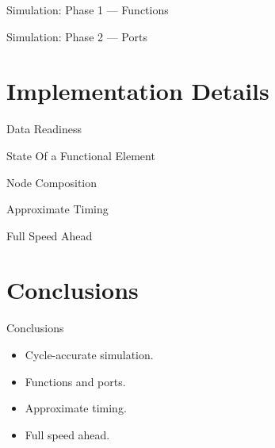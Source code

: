 \begin{frame}{Simulation: Phase 1 --- Functions}
\centering
{}
\end{frame}

\begin{frame}{Simulation: Phase 2 --- Ports}
\centering
{}
\end{frame}

\section{Implementation Details}

\begin{frame}{Data Readiness}
\centering
{}
\end{frame}

\begin{frame}{State Of a Functional Element}
\centering
{}
\end{frame}

\begin{frame}{Node Composition}
\centering
{}
\end{frame}

\begin{frame}{Approximate Timing}
\centering
{}
\end{frame}

\begin{frame}{Full Speed Ahead}
\centering
{}
\end{frame}

\section*{Conclusions}

\begin{frame}{Conclusions}
\begin{itemize}
\item Cycle-accurate simulation.
\item Functions and ports.
\item Approximate timing.
\item Full speed ahead.
\end{itemize}
\end{frame}

